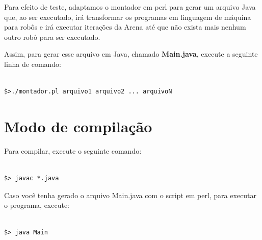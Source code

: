 \documentclass[11pt]{article}
\begin{document}
Para efeito de teste, adaptamos o montador em perl para gerar um arquivo Java que, ao ser executado, irá transformar os programas em linguagem de máquina para robôs e irá executar iterações da Arena até que não exista mais nenhum outro robô para ser executado.

Assim, para gerar esse arquivo em Java, chamado \textbf{\color{red}Main.java}, execute a seguinte linha de comando:
\begin{verbatim}

$>./montador.pl arquivo1 arquivo2 ... arquivoN

\end{verbatim}

\section{Modo de compilação}

Para compilar, execute o seguinte comando:

\begin{verbatim}

$> javac *.java

\end{verbatim}

Caso você tenha gerado o arquivo Main.java com o script em perl, para executar o programa, execute:

\begin{verbatim}

$> java Main

\end{verbatim}
\end{document}
